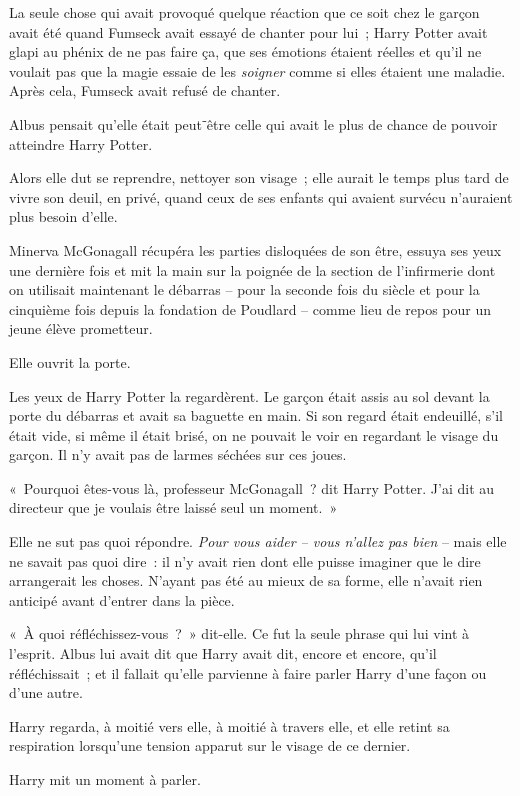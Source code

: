 La seule chose qui avait provoqué quelque réaction que ce soit chez le garçon avait été quand Fumseck avait essayé de chanter pour lui~; Harry Potter avait glapi au phénix de ne pas faire ça, que ses émotions étaient réelles et qu'il ne voulait pas que la magie essaie de les \emph{soigner} comme si elles étaient une maladie. Après cela, Fumseck avait refusé de chanter.

Albus pensait qu'elle était peut⁻être celle qui avait le plus de chance de pouvoir atteindre Harry Potter.

Alors elle dut se reprendre, nettoyer son visage~; elle aurait le temps plus tard de vivre son deuil, en privé, quand ceux de ses enfants qui avaient survécu n'auraient plus besoin d'elle.

Minerva McGonagall récupéra les parties disloquées de son être, essuya ses yeux une dernière fois et mit la main sur la poignée de la section de l'infirmerie dont on utilisait maintenant le débarras -- pour la seconde fois du siècle et pour la cinquième fois depuis la fondation de Poudlard -- comme lieu de repos pour un jeune élève prometteur.

Elle ouvrit la porte.

Les yeux de Harry Potter la regardèrent. Le garçon était assis au sol devant la porte du débarras et avait sa baguette en main. Si son regard était endeuillé, s'il était vide, si même il était brisé, on ne pouvait le voir en regardant le visage du garçon. Il n'y avait pas de larmes séchées sur ces joues.

«~Pourquoi êtes-vous là, professeur McGonagall~? dit Harry Potter. J'ai dit au directeur que je voulais être laissé seul un moment.~»

Elle ne sut pas quoi répondre. \emph{Pour vous aider -- vous n'allez pas bien} -- mais elle ne savait pas quoi dire~: il n'y avait rien dont elle puisse imaginer que le dire arrangerait les choses. N'ayant pas été au mieux de sa forme, elle n'avait rien anticipé avant d'entrer dans la pièce.

«~À quoi réfléchissez-vous~?~» dit-elle. Ce fut la seule phrase qui lui vint à l'esprit. Albus lui avait dit que Harry avait dit, encore et encore, qu'il réfléchissait~; et il fallait qu'elle parvienne à faire parler Harry d'une façon ou d'une autre.

Harry regarda, à moitié vers elle, à moitié à travers elle, et elle retint sa respiration lorsqu'une tension apparut sur le visage de ce dernier.

Harry mit un moment à parler.

